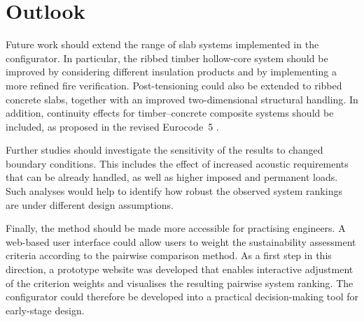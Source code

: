 \chapter{Outlook}\label{chap:Outlook} 
Future work should extend the range of slab systems implemented in the configurator. In particular, the ribbed timber hollow-core system should be improved by considering different insulation products and by implementing a more refined fire verification. Post-tensioning could also be extended to ribbed concrete slabs, together with an improved two-dimensional structural handling. In addition, continuity effects for timber--concrete composite systems should be included, as proposed in the revised Eurocode~5 \cite{Eurocode5_2023}.

Further studies should investigate the sensitivity of the results to changed boundary conditions. This includes the effect of increased acoustic requirements that can be already handled, as well as higher imposed and permanent loads. Such analyses would help to identify how robust the observed system rankings are under different design assumptions.

Finally, the method should be made more accessible for practising engineers. A web-based user interface could allow users to weight the sustainability assessment criteria according to the pairwise comparison method. As a first step in this direction, a prototype website was developed that enables interactive adjustment of the criterion weights and visualises the resulting pairwise system ranking. The configurator could therefore be developed into a practical decision-making tool for early-stage design.
